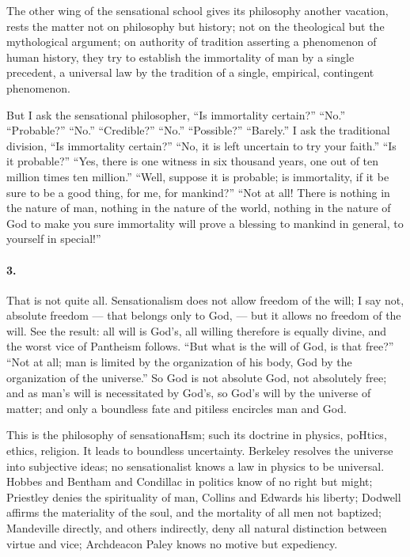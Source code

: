 \documentclass[12pt]{article}
\begin{document}


The other wing of the sensational school gives its 
philosophy another vacation, rests the matter not on 
philosophy but history; not on the theological but the 
mythological argument; on authority of tradition asserting a phenomenon of human history, they try to 
establish the immortality of man by a single precedent, 
a universal law by the tradition of a single, empirical, 
contingent phenomenon. 

But I ask the sensational philosopher, ``Is immortality certain?'' ``No.'' ``Probable?'' ``No.'' ``Credible?'' ``No.'' ``Possible?'' ``Barely.'' I ask the 
traditional division, ``Is immortality certain?'' ``No, 
it is left uncertain to try your faith.'' ``Is it probable?'' ``Yes, there is one witness in six thousand 
years, one out of ten million times ten million.'' ``Well, 
suppose it is probable; is immortality, if it be sure to 
be a good thing, for me, for mankind?'' ``Not at 
all! There is nothing in the nature of man, nothing 
in the nature of the world, nothing in the nature of 
God to make you sure immortality will prove a blessing to mankind in general, to yourself in special!'' 

\paragraph{3.} That is not quite all. Sensationalism does not 
allow freedom of the will; I say not, absolute freedom --- that belongs only to God, --- but it allows no 
freedom of the will. See the result: all will is God's, 
all willing therefore is equally divine, and the worst 
vice of Pantheism follows. ``But what is the will of 
God, is that free?'' ``Not at all; man is limited by 
the organization of his body, God by the organization 
of the universe.'' So God is not absolute God, not 
absolutely free; and as man's will is necessitated by 
God's, so God's will by the universe of matter; and 
only a boundless fate and pitiless encircles man and 
God. 


This is the philosophy of sensationaHsm; such its 
doctrine in physics, poHtics, ethics, religion. It leads 
to boundless uncertainty. Berkeley resolves the universe into subjective ideas; no sensationalist knows a 
law in physics to be universal. Hobbes and Bentham 
and Condillac in politics know of no right but might; 
Priestley denies the spirituality of man, Collins and 
Edwards his liberty; Dodwell affirms the materiality of 
the soul, and the mortality of all men not baptized; 
Mandeville directly, and others indirectly, deny all natural distinction between virtue and vice; Archdeacon 
Paley knows no motive but expediency. 
\end{document}
